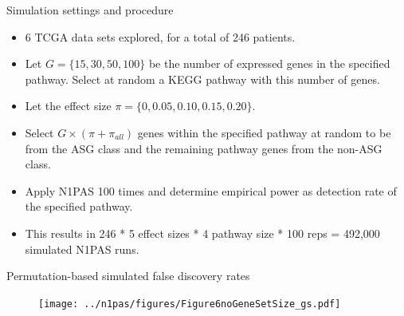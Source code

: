 \documentclass[ignorenonframetext,aspectratio=169,]{beamer}
\begin{document}
\begin{frame}{%
\protect\hypertarget{simulation-settings-and-procedure}{%
Simulation settings and procedure}}

\begin{itemize}
        \setlength\itemsep{0.5em}
  \item 6 TCGA data sets explored, for a total of 246 patients.
    \item Let $G=\{15, 30, 50, 100\}$ be the number of expressed genes in the specified pathway. Select at random a KEGG pathway with this number of genes.
    \item Let the effect size $\pi=\{0, 0.05, 0.10, 0.15, 0.20\}$.
    \item Select $G \times (\pi + \pi_{all})$ genes within the specified pathway at random to be from the ASG class and the remaining pathway genes from the non-ASG class.
    \item Apply N1PAS 100 times and determine empirical power as detection rate of the specified pathway.
      \item This results in 246 * 5 effect sizes * 4 pathway size * 100 reps = 492,000 simulated N1PAS runs.
\end{itemize}

\end{frame}

\begin{frame}{%
\protect\hypertarget{permutation-based-simulated-false-discovery-rates}{%
Permutation-based simulated false discovery rates}}

\begin{figure}[htb]
  \centering \texttt{[image: ../n1pas/figures/Figure6noGeneSetSize\_gs.pdf]}
\end{figure}

\end{frame}
\end{document}
